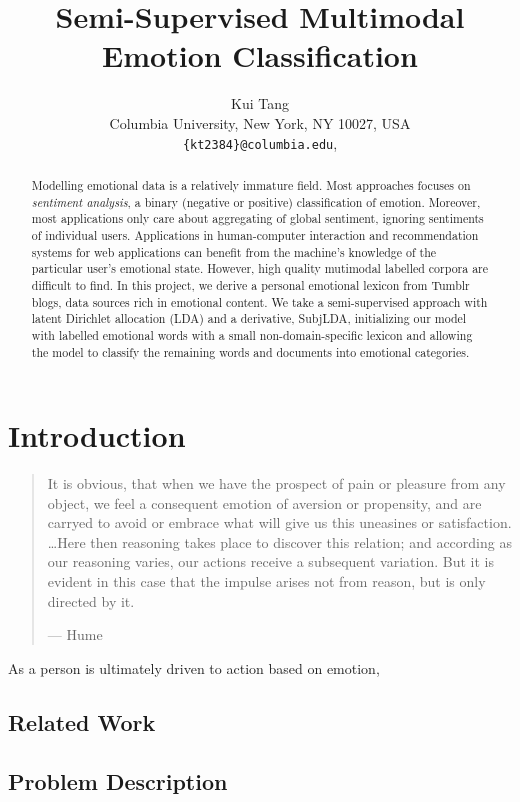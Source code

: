 \documentclass{article}
\title{Semi-Supervised Multimodal Emotion Classification}
\author{
Kui Tang\\
Columbia University, New York, NY 10027, USA\\
\texttt{\{kt2384\}@columbia.edu},
}
\begin{document}
\maketitle

\begin{abstract}
Modelling emotional data is a relatively immature field. Most
approaches focuses on \emph{sentiment analysis}, a binary (negative
or positive) classification of emotion. Moreover, most applications
only care about aggregating of global sentiment, ignoring sentiments
of individual users.  Applications in human-computer interaction
and recommendation systems for web applications can benefit from
the machine's knowledge of the particular user's emotional state.
However, high quality mutimodal labelled corpora are difficult to
find. In this project, we derive a personal emotional lexicon from
Tumblr blogs, data sources rich in emotional content. We take a
semi-supervised approach with latent Dirichlet allocation (LDA) and
a derivative, SubjLDA, initializing our model with labelled emotional
words with a small non-domain-specific lexicon and allowing the
model to classify the remaining words and documents into emotional
categories.
\end{abstract}

\section{Introduction}
\begin{quote}
It is obvious, that when we have the prospect of pain or pleasure
from any object, we feel a consequent emotion of aversion or
propensity, and are carryed to avoid or embrace what will give us
this uneasines or satisfaction. \ldots Here then reasoning takes
place to discover this relation; and according as our reasoning
varies, our actions receive a subsequent variation. But it is evident
in this case that the impulse arises not from reason, but is only
directed by it.

\hspace{9 cm} --- Hume \citep{hume}
\end{quote}
As a person is ultimately driven to action based on emotion, 

\label{sec:introduction}

\subsection{Related Work}
\citep{lin03}
\subsection{Problem Description}
\end{document}
